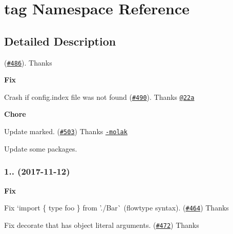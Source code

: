 \hypertarget{namespacetag}{}\section{tag Namespace Reference}
\label{namespacetag}


\subsection{Detailed Description}
(\href{https://github.com/esdoc/esdoc/pull/486}{\tt \#486}). Thanks \href{https://github.com/bmaupin}{\tt }
\begin{DoxyItemize}
\item {\bfseries Fix}
\begin{DoxyItemize}
\item Crash if {\ttfamily config.\+index} file was not found (\href{https://github.com/esdoc/esdoc/pull/490}{\tt \#490}). Thanks \href{https://github.com/22a}{\tt @22a}
\end{DoxyItemize}
\item {\bfseries Chore}
\begin{DoxyItemize}
\item Update {\ttfamily marked}. (\href{https://github.com/esdoc/esdoc/pull/503}{\tt \#503}) Thanks \href{https://github.com/jan-molak}{\tt -\/molak}
\item Update some packages.
\end{DoxyItemize}
\end{DoxyItemize}

\subsubsection*{1.. (2017-\/11-\/12)}


\begin{DoxyItemize}
\item {\bfseries Fix}
\begin{DoxyItemize}
\item Fix `import \{ type foo \} from './\+Bar\textquotesingle{}\`{} (flowtype syntax). (\href{https://github.com/esdoc/esdoc/pull/464}{\tt \#464}) Thanks \href{https://github.com/mprobber}{\tt }
\item Fix decorate that has object literal arguments. (\href{https://github.com/esdoc/esdoc/pull/472}{\tt \#472}) Thanks \href{https://github.com/mysim1}{\tt }
\end{DoxyItemize}
\end{DoxyItemize}

